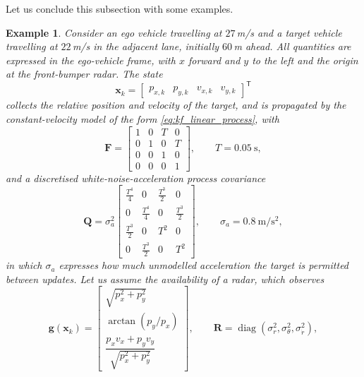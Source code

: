 \documentclass[11pt,oneside,openany]{book}
\newtheorem{example}{Example}[chapter]
\begin{document}
Let us conclude this subsection with some examples.

\color{olive}
\begin{example}
\label{ex:ekf-radar-cutin}
Consider an ego vehicle travelling at $27$\,m/s and a target vehicle travelling
at $22$\,m/s in the adjacent lane, initially $60$\,m ahead. All quantities are
expressed in the ego-vehicle frame, with $x$ forward and $y$ to the left and the
origin at the front-bumper radar. The state
\begin{equation}
\mathbf{x}_k=
\begin{bmatrix}
p_{x,k} & p_{y,k} & v_{x,k} & v_{y,k}
\end{bmatrix}^{\mathsf T}
\end{equation}
collects the relative position and velocity of the target, and is propagated by
the constant-velocity model of the form
\eqref{eq:kf_linear_process}, with
\begin{equation}
\mathbf{F}=
\begin{bmatrix}
1&0&T&0\\
0&1&0&T\\
0&0&1&0\\
0&0&0&1
\end{bmatrix},
\qquad T=0.05\ \mathrm{s},
\end{equation}
and a discretised white-noise-acceleration process covariance
\begin{equation}
\mathbf{Q}=\sigma_a^{2}
\begin{bmatrix}
\tfrac{T^{4}}{4}&0&\tfrac{T^{3}}{2}&0\\[2pt]
0&\tfrac{T^{4}}{4}&0&\tfrac{T^{3}}{2}\\[2pt]
\tfrac{T^{3}}{2}&0&T^{2}&0\\[2pt]
0&\tfrac{T^{3}}{2}&0&T^{2}
\end{bmatrix},
\qquad \sigma_a=0.8\ \mathrm{m/s^{2}},
\end{equation}
in which $\sigma_a$ expresses how much unmodelled acceleration the target is
permitted between updates. 
Let us assume the availability of a radar, which observes
\begin{equation}
\mathbf{g}(\mathbf{x}_k)=
\begin{bmatrix}
\sqrt{p_x^{2}+p_y^{2}}\\[4pt]
\arctan\!\left(p_y/p_x\right)\\[4pt]
\dfrac{p_xv_x+p_yv_y}{\sqrt{p_x^{2}+p_y^{2}}}
\end{bmatrix},
\qquad
\mathbf{R}=\operatorname{diag}\!\left(\sigma_r^{2},\sigma_\theta^{2},\sigma_{\dot r}^{2}\right),

\end{equation}
\end{example}
\end{document}
